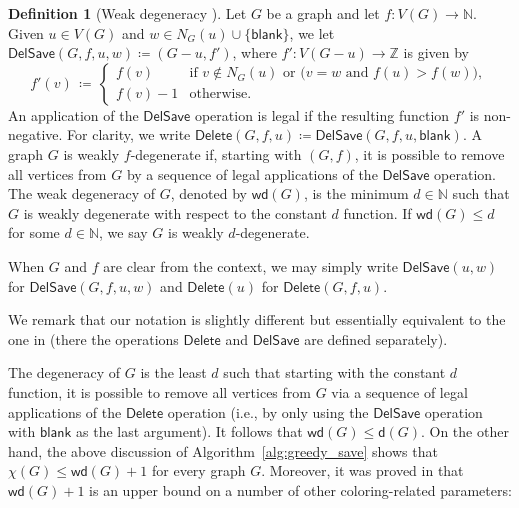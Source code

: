 \documentclass[11pt]{article}
\theoremstyle{slantthm}
\numberwithin{equation}{section}
\theoremstyle{definition}
\newtheorem{definition}[thm]{Definition}
\renewcommand{\leq}{\leqslant}
\newcommand{\defeq}{\coloneqq}
\numberwithin{equation}{section}
\newcommand{\N}{\mathbb{N}}
\newcommand{\Z}{\mathbb{Z}}
\newcommand{\0}{\varnothing}
\newcommand{\set}[1]{\{#1\}}
\newcommand{\emphd}[1]{{\fontseries{b}\selectfont\textsf{#1}}}
\newcommand{\de}{\mathsf{d}}
\newcommand{\wde}{\mathsf{wd}}
\newcommand{\del}{\mathsf{Delete}}
\newcommand{\delsave}{\mathsf{DelSave}}
\newcommand{\blank}{\mathsf{blank}}
\begin{document}
    \begin{definition}[{Weak degeneracy \cite{WD}}]
        Let $G$ be a graph and let $f \colon V(G) \to \N$. Given $u \in V(G)$ and $w \in N_G(u) \cup \set{\blank}$, we let $\delsave(G,f,u,w) \defeq (G - u,f')$, where $f' \colon V(G - u) \to \Z$ is given by
            \[
                f'(v) \,\defeq\, \begin{cases}
                    f(v) &\text{if } v \notin N_G(u) \text{ or } \big(v = w \text{ and } f(u) > f(w)\big),\\
                    f(v) - 1 &\text{otherwise}.
                \end{cases}
            \]
        An application of the $\delsave$ operation is \emphd{legal} if the resulting function $f'$ is non-negative. For clarity, we write $\del(G,f,u) \defeq \delsave(G,f,u,\blank)$. A graph $G$ is \emphd{weakly $f$-degenerate} if, starting with $(G,f)$, it is possible to remove all vertices from $G$ by a sequence of legal applications of the $\delsave$ operation. The \emphd{weak degeneracy} of $G$, denoted by $\wde(G)$, is the minimum $d \in \N$ such that $G$ is weakly degenerate with respect to the constant $d$ function. If $\wde(G) \leq d$ for some $d \in \N$, we say $G$ is \emphd{weakly $d$-degenerate}.
        
        When $G$ and $f$ are clear from the context, we may simply write $\delsave(u,w)$ for $\delsave(G,f,u,w)$ and $\del(u)$ for $\del(G,f,u)$.
    \end{definition}

    We remark that our notation is slightly different but essentially equivalent to the one in \cite{WD} (there the operations $\del$ and $\delsave$ are defined separately).

    The degeneracy of $G$ is the least $d$ such that starting with the constant $d$ function, it is possible to remove all vertices from $G$ via a sequence of legal applications of the $\del$ operation (i.e., by only using the $\delsave$ operation with $\blank$ as the last argument). It follows that $\wde(G) \leq \de(G)$. On the other hand, the above discussion of Algorithm~\ref{alg:greedy_save} shows that $\chi(G) \leq \wde(G) + 1$ for every graph $G$. Moreover, it was proved in \cite{WD} that $\wde(G) + 1$ is an upper bound on a number of other coloring-related parameters:
\end{document}
